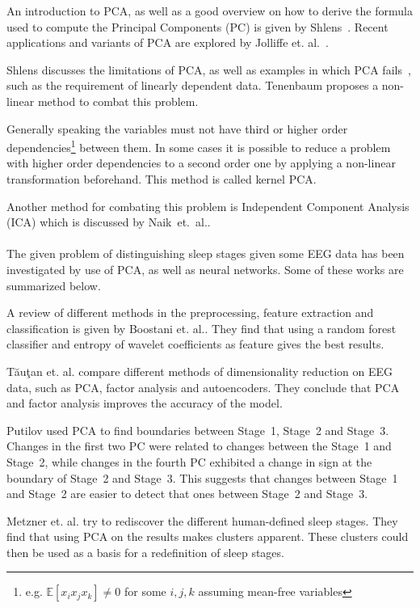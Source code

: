 \documentclass[a4paper]{IEEEtran}
\begin{document}
An introduction to PCA, as well as a good overview on how to derive the formula used to compute the Principal Components (PC) is given by Shlens~\cite{Shlens2014}.
Recent applications and variants of PCA are explored by Jolliffe et. al.~\cite{Jolliffe2016}.

Shlens discusses the limitations of PCA, as well as examples in which PCA fails~\cite{Shlens2014}, such as the requirement of linearly dependent data.
Tenenbaum proposes a non-linear method to combat this problem\cite{Tenenbaum2000}.

Generally speaking the variables must not have third or higher order dependencies\footnote{e.g. $\mathbb{E}[x_ix_jx_k] \neq 0$ for some $i, j, k$ assuming mean-free variables} between them. In some cases it is possible to reduce a problem with higher order dependencies to a second order one by applying a non-linear transformation beforehand. This method is called kernel PCA\cite{Shlens2014}.

Another method for combating this problem is Independent Component Analysis (ICA) which is discussed by Naik~et.~al.\cite{Naik2011}.
\\
\\
The given problem of distinguishing sleep stages given some EEG data has been investigated by use of PCA, as well as neural networks. Some of these works are summarized below.

A review of different methods in the preprocessing, feature extraction and classification is given by Boostani et. al.\cite{Boostani2017}. They find that using a random forest classifier and entropy of wavelet coefficients as feature gives the best results.

Tăuţan et. al.\cite{Tautan2021} compare different methods of dimensionality reduction on EEG data, such as PCA, factor analysis and autoencoders. They conclude that PCA and factor analysis improves the accuracy of the model.

Putilov\cite{Putilov2015} used PCA to find boundaries between Stage~1, Stage~2 and Stage~3. Changes in the first two PC were related to changes between the Stage~1 and Stage~2, while changes in the fourth PC exhibited a change in sign at the boundary of Stage~2 and Stage~3. This suggests that changes between Stage~1 and Stage~2 are easier to detect that ones between Stage~2 and Stage~3.

Metzner et. al.\cite{Metzner2023} try to rediscover the different human-defined sleep stages. They find that using PCA on the results makes clusters apparent. These clusters could then be used as a basis for a redefinition of sleep stages.
\end{document}

